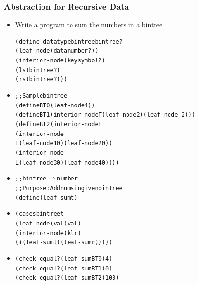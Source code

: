\documentclass{beamer}
\newcommand{\arrow}{\(\rightarrow\)}
\newcommand{\quot}{\texttt{\textquotesingle{}}}
\begin{document}
\begin{frame}[fragile]
\frametitle{Abstraction for Recursive Data}
\begin{scriptsize}
\begin{itemize}
\item<1-> Write a program to sum the numbers in a bintree
\begin{alltt}
(define-datatype bintree bintree?
  (leaf-node (data number?))
  (interior-node (key symbol?)
                 (lst bintree?)
                 (rst bintree?)))
\end{alltt}

\item<2->
\begin{alltt}
;; Sample bintree
(define BT0 (leaf-node 4))
(define BT1 (interior-node \quot{}T (leaf-node 2) (leaf-node -2)))
(define BT2 (interior-node \quot{}T
                           (interior-node
                             \quot{}L (leaf-node 10) (leaf-node 20))
                           (interior-node
                             \quot{}L (leaf-node 30) (leaf-node 40))))
\end{alltt}

\item<3->
\begin{alltt}
;; bintree \arrow{} number
;; Purpose: Add nums in given bintree
(define (leaf-sum t)
\end{alltt}

\item<5->
\begin{alltt}
  (cases bintree t
    (leaf-node (val) val)
    (interior-node (k l r)
      (+ (leaf-sum l) (leaf-sum r)))))
\end{alltt}

\item<4->
\begin{alltt}
(check-equal? (leaf-sum BT0) 4)
(check-equal? (leaf-sum BT1) 0)
(check-equal? (leaf-sum BT2) 100)
\end{alltt}
\end{itemize}
\end{scriptsize}
\end{frame}
\end{document}
